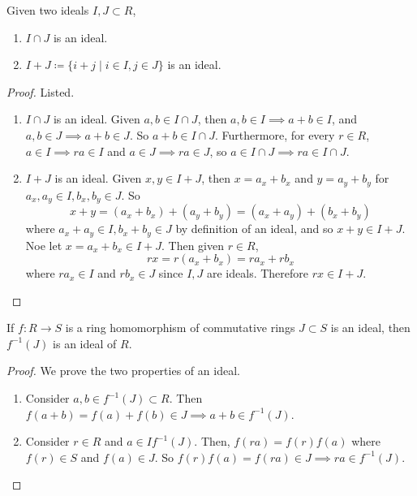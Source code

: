   \begin{theorem} 
    \label{thm:sum_int_ideals}
    Given two ideals $I, J \subset R$, 
    \begin{enumerate}
      \item $I \cap J$ is an ideal. 
      \item $I + J \coloneqq \{i + j \mid i \in I, j \in J\}$ is an ideal. 
    \end{enumerate}
  \end{theorem}
  \begin{proof}
    Listed. 
    \begin{enumerate}
      \item $I \cap J$ is an ideal. Given $a, b \in I \cap J$, then $a, b \in I \implies a + b \in I$, and $a, b \in J \implies a + b \in J$. So $a + b \in I \cap J$. Furthermore, for every $r \in R$, $a \in I \implies r a \in I$ and $a \in J \implies r a \in J$, so $a \in I \cap J \implies ra \in I \cap J$. 

      \item $I + J$ is an ideal. Given $x, y \in I + J$, then $x = a_x + b_x$ and $y = a_y + b_y$ for $a_x, a_y \in I, b_x, b_y \in J$. So 
      \begin{equation}
        x + y = (a_x + b_x) + (a_y + b_y) = (a_x + a_y) + (b_x + b_y)
      \end{equation}
      where $a_x + a_y \in I, b_x + b_y \in J$ by definition of an ideal, and so $x + y \in I + J$. Noe let $x = a_x + b_x \in I + J$. Then given $r \in R$,
      \begin{equation}
        rx = r(a_x + b_x) = r a_x + r b_x
      \end{equation}
      where $r a_x \in I$ and $r b_x \in J$ since $I, J$ are ideals. Therefore $rx \in I + J$.  
    \end{enumerate}
  \end{proof}
  
  \begin{theorem}
    \label{thm:preimage-of-ideals-are-ideals}
    If $f: R \to S$ is a ring homomorphism of commutative rings $J \subset S$ is an ideal, then $f^{-1} (J)$ is an ideal of $R$. 
  \end{theorem}
  \begin{proof}
    We prove the two properties of an ideal. 
    \begin{enumerate}
      \item Consider $a, b \in f^{-1} (J) \subset R$. Then $f(a + b) = f(a) + f(b) \in J \implies a + b \in f^{-1}(J)$. 
      \item Consider $r \in R$ and $a \in I f^{-1}(J)$. Then, $f(ra) = f(r) f(a)$ where $f(r) \in S$ and $f(a) \in J$. So $f(r) f(a) = f(ra) \in J \implies ra \in f^{-1}(J)$. 
    \end{enumerate}
  \end{proof}

